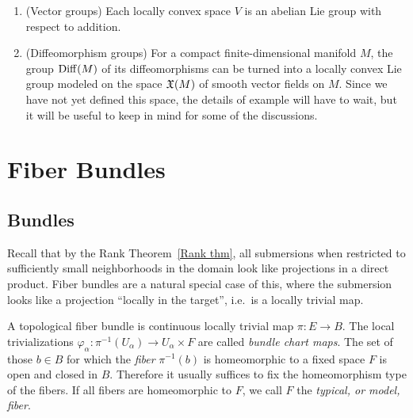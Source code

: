 \begin{example}
    \begin{enumerate}[label=(\alph*)]
        \item (Vector groups) Each locally convex space $V$ is an abelian Lie group with respect to addition.
        \item (Diffeomorphism groups) For a compact finite-dimensional manifold $M$, the group $\operatorname{Diff}(M)$ of its diffeomorphisms can be turned into a locally convex Lie group modeled on the space $\mathfrak{X}(M)$ of smooth vector fields on $M$. Since we have not yet defined this space, the details of example will have to wait, but it will be useful to keep in mind for some of the discussions.
    \end{enumerate}
\end{example}











\clearpage
\section{Fiber Bundles}\label{sec: Fiber bundles}

\subsection{Bundles}

Recall that by the Rank Theorem~\ref{Rank thm}, all submersions when restricted to sufficiently small neighborhoods in the domain look like projections in a direct product. Fiber bundles are a natural special case of this, where the submersion looks like a projection ``locally in the target'', i.e.~is a locally trivial map. 

\begin{defn}
    A topological fiber bundle is continuous locally trivial map $\pi:E\to B$. The local trivializations $\varphi_\alpha:\pi^{-1}(U_\alpha)\to U_\alpha\times F$ are called \emph{bundle chart maps}. The set of those $b\in B$ for which the \emph{fiber} $\pi^{-1}(b)$ is homeomorphic to a fixed space $F$ is open and closed in $B$. Therefore it usually suffices to fix the homeomorphism type of the fibers. If all fibers are homeomorphic to $F$, we call $F$ the \emph{typical, or model, fiber}.
\end{defn}

